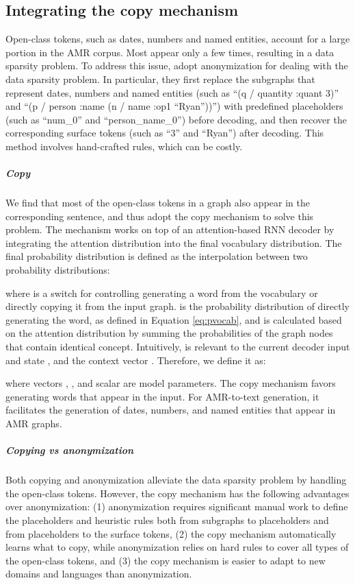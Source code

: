 \documentclass[11pt,a4paper]{article}
\begin{document}
\subsection{Integrating the copy mechanism}
\label{sec:copy}


Open-class tokens, such as dates, numbers and named entities, account for a large portion in the AMR corpus. 
Most appear only a few times, resulting in a data sparsity problem.
To address this issue,  adopt anonymization for dealing with the data sparsity problem.
In particular, they first replace the subgraphs that represent dates, numbers and named entities (such as ``(q / quantity :quant 3)'' and ``(p / person :name (n / name :op1 ``Ryan''))'') with predefined placeholders (such as ``num\_0'' and ``person\_name\_0'') before decoding, and then recover the corresponding surface tokens (such as ``3'' and ``Ryan'') after decoding.
This method involves hand-crafted rules, which can be costly.


\subparagraph{Copy}
We find that most of the open-class tokens in a graph also appear in the corresponding sentence, and thus adopt the copy mechanism \cite{gulcehre-EtAl:2016:P16-1,gu-EtAl:2016:P16-1} to solve this problem.
The mechanism works on top of an attention-based RNN decoder by integrating the attention distribution into the final vocabulary distribution.
The final probability distribution is defined as the interpolation between two probability distributions:

where  is a switch for controlling generating a word from the vocabulary or directly copying it from the input graph.
 is the probability distribution of directly generating the word, as defined in Equation \ref{eq:pvocab}, and 
 is calculated based on the attention distribution  by summing the probabilities of the graph nodes that contain identical concept.
Intuitively,  is relevant to the current decoder input  and state , and the context vector .
Therefore, we define it as:

where vectors , ,  and scalar  are model parameters.
The copy mechanism favors generating words that appear in the input.
For AMR-to-text generation, it facilitates the generation of dates, numbers, and named entities that appear in AMR graphs.

\subparagraph{Copying vs anonymization}
Both copying and anonymization alleviate the data sparsity problem by handling the open-class tokens.
However, the copy mechanism has the following advantages over anonymization:
(1) anonymization requires significant manual work to define the placeholders and heuristic rules both from subgraphs to placeholders and from placeholders to the surface tokens, 
(2) the copy mechanism automatically learns what to copy, while anonymization relies on hard rules to cover all types of the open-class tokens, 
and (3) the copy mechanism is easier to adapt to new domains and languages than anonymization.
\end{document}
